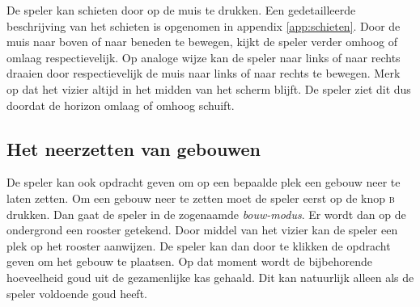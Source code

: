     De speler kan schieten door op de muis te drukken. Een gedetailleerde beschrijving van het schieten is opgenomen in appendix \ref{app:schieten}. Door de muis naar boven of naar beneden te bewegen, kijkt de speler verder omhoog of omlaag respectievelijk. Op analoge wijze kan de speler naar links of naar rechts draaien door respectievelijk de muis naar links of naar rechts te bewegen. Merk op dat het vizier altijd in het midden van het scherm blijft. De speler ziet dit dus doordat de horizon omlaag of omhoog schuift.

    \subsection{Het neerzetten van gebouwen}
    De speler kan ook opdracht geven om op een bepaalde plek een gebouw neer te laten zetten. Om een gebouw neer te zetten moet de speler eerst op de knop \textsc{b} drukken. Dan gaat de speler in de zogenaamde \emph{bouw-modus}. Er wordt dan op de ondergrond een rooster getekend. Door middel van het vizier kan de speler een plek op het rooster aanwijzen. De speler kan dan door te klikken de opdracht geven om het gebouw te plaatsen. Op dat moment wordt de bijbehorende hoeveelheid goud uit de gezamenlijke kas gehaald. Dit kan natuurlijk alleen als de speler voldoende goud heeft.
    
